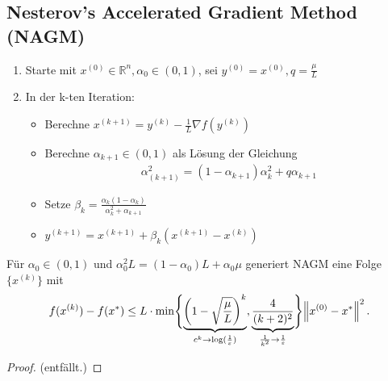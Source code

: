 \subsection{Nesterov's Accelerated Gradient Method (NAGM)}
\begin{enumerate}
\item Starte mit $x^{(0)} \in \mathbb{R}^n, \alpha_0 \in (0, 1)$, sei $y^{(0)} = x^{(0)}, q = \frac{\mu}{L}$
\item In der k-ten Iteration:
\begin{itemize}
	\item Berechne $x^{(k + 1)} = y^{(k)} - \frac{1}{L} \nabla f(y^{(k)})$
	\item Berechne $\alpha_{k+1} \in (0, 1)$ als Lösung der Gleichung
	\begin{align*}
	\alpha_{(k + 1)}^2 = (1 - \alpha_{k + 1}) \alpha_k^2 + q \alpha_{k + 1}
	\end{align*}
	\item Setze $\beta_k = \frac{\alpha_k(1 - \alpha_k)}{\alpha_k^2 + \alpha_{k + 1}}$
	\item $y^{(k + 1)} = x^{(k + 1)} + \beta_k ( x^{(k + 1)} - x^{(k)})$
\end{itemize}
\end{enumerate}

\begin{Theorem}
Für $\alpha_0 \in (0,1)$ und $\alpha_0^2 L = (1 - \alpha_0)L + \alpha_0 \mu$ generiert NAGM eine Folge $\lbrace x^{(k)} \rbrace$ mit 
\begin{align*}
f(x^{(k)}) - f(x^*) \leq L \cdot \min\Biggl\{\underbrace{\left(1 - \sqrt{\frac{\mu}{L}}\right)^k}_{c^k\rightarrow\log(\frac{1}{\varepsilon})}, \underbrace{\frac{4}{(k + 2)^2}}_{\frac{1}{k^2}\rightarrow\frac{1}{\varepsilon}}\Biggl\} \left\lVert x^{(0)} - x^*\right\rVert^2.
\end{align*}
\end{Theorem}
\begin{proof}
(entfällt.)
\end{proof}